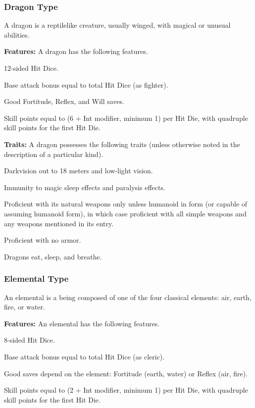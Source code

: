 \subsubsection{Dragon Type}
A dragon is a reptilelike creature, usually winged, with magical or unusual abilities.

\textbf{Features:} A dragon has the following features.
\begin{itemize*}
\item 12-sided Hit Dice.
\item Base attack bonus equal to total Hit Dice (as fighter).
\item Good Fortitude, Reflex, and Will saves.
\item Skill points equal to (6 + Int modifier, minimum 1) per Hit Die, with quadruple skill points for the first Hit Die.
\end{itemize*}

\textbf{Traits:} A dragon possesses the following traits (unless otherwise noted in the description of a particular kind).
\begin{itemize*}
\item Darkvision out to 18 meters and low-light vision.
\item Immunity to magic sleep effects and paralysis effects.
\item Proficient with its natural weapons only unless humanoid in form (or capable of assuming humanoid form), in which case proficient with all simple weapons and any weapons mentioned in its entry.
\item Proficient with no armor.
\item Dragons eat, sleep, and breathe.
\end{itemize*}

\subsubsection{Elemental Type}
An elemental is a being composed of one of the four classical elements: air, earth, fire, or water.

\textbf{Features:} An elemental has the following features.
\begin{itemize*}
\item 8-sided Hit Dice.
\item Base attack bonus equal to \threequarters total Hit Dice (as cleric).
\item Good saves depend on the element: Fortitude (earth, water) or Reflex (air, fire).
\item Skill points equal to (2 + Int modifier, minimum 1) per Hit Die, with quadruple skill points for the first Hit Die.
\end{itemize*}


